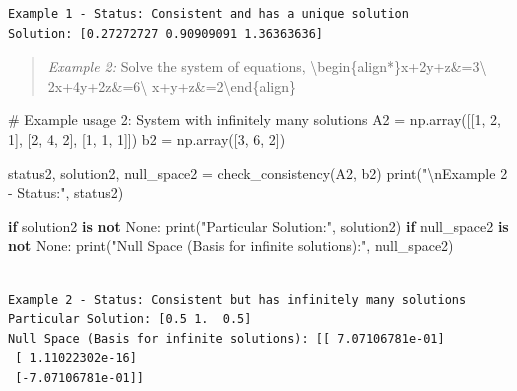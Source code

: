 \documentclass[
  letterpaper,
  DIV=11,
  numbers=noendperiod]{scrreprt}
\newenvironment{Shaded}{\begin{snugshade}}{\end{snugshade}}
\newcommand{\BuiltInTok}[1]{\textcolor[rgb]{0.00,0.23,0.31}{#1}}
\newcommand{\CharTok}[1]{\textcolor[rgb]{0.13,0.47,0.30}{#1}}
\newcommand{\CommentTok}[1]{\textcolor[rgb]{0.37,0.37,0.37}{#1}}
\newcommand{\ControlFlowTok}[1]{\textcolor[rgb]{0.00,0.23,0.31}{\textbf{#1}}}
\newcommand{\DecValTok}[1]{\textcolor[rgb]{0.68,0.00,0.00}{#1}}
\newcommand{\KeywordTok}[1]{\textcolor[rgb]{0.00,0.23,0.31}{\textbf{#1}}}
\newcommand{\NormalTok}[1]{\textcolor[rgb]{0.00,0.23,0.31}{#1}}
\newcommand{\OperatorTok}[1]{\textcolor[rgb]{0.37,0.37,0.37}{#1}}
\newcommand{\StringTok}[1]{\textcolor[rgb]{0.13,0.47,0.30}{#1}}
\newcommand{\VariableTok}[1]{\textcolor[rgb]{0.07,0.07,0.07}{#1}}
\theoremstyle{plain}
\theoremstyle{definition}
\theoremstyle{remark}
\begin{document}
\begin{verbatim}
Example 1 - Status: Consistent and has a unique solution
Solution: [0.27272727 0.90909091 1.36363636]
\end{verbatim}

\begin{quote}
\emph{Example 2:} Solve the system of equations,
\textbackslash begin\{align*\}x+2y+z\&=3\textbackslash{}
2x+4y+2z\&=6\textbackslash{} x+y+z\&=2\textbackslash end\{align\}
\end{quote}

\begin{Shaded}
\begin{Highlighting}[]
\CommentTok{\# Example usage 2: System with infinitely many solutions}
\NormalTok{A2 }\OperatorTok{=}\NormalTok{ np.array([[}\DecValTok{1}\NormalTok{, }\DecValTok{2}\NormalTok{, }\DecValTok{1}\NormalTok{], [}\DecValTok{2}\NormalTok{, }\DecValTok{4}\NormalTok{, }\DecValTok{2}\NormalTok{], [}\DecValTok{1}\NormalTok{, }\DecValTok{1}\NormalTok{, }\DecValTok{1}\NormalTok{]])}
\NormalTok{b2 }\OperatorTok{=}\NormalTok{ np.array([}\DecValTok{3}\NormalTok{, }\DecValTok{6}\NormalTok{, }\DecValTok{2}\NormalTok{])}

\NormalTok{status2, solution2, null\_space2 }\OperatorTok{=}\NormalTok{ check\_consistency(A2, b2)}
\BuiltInTok{print}\NormalTok{(}\StringTok{"}\CharTok{\textbackslash{}n}\StringTok{Example 2 {-} Status:"}\NormalTok{, status2)}

\ControlFlowTok{if}\NormalTok{ solution2 }\KeywordTok{is} \KeywordTok{not} \VariableTok{None}\NormalTok{:}
    \BuiltInTok{print}\NormalTok{(}\StringTok{"Particular Solution:"}\NormalTok{, solution2)}
\ControlFlowTok{if}\NormalTok{ null\_space2 }\KeywordTok{is} \KeywordTok{not} \VariableTok{None}\NormalTok{:}
    \BuiltInTok{print}\NormalTok{(}\StringTok{"Null Space (Basis for infinite solutions):"}\NormalTok{, null\_space2)}
\end{Highlighting}
\end{Shaded}

\begin{verbatim}

Example 2 - Status: Consistent but has infinitely many solutions
Particular Solution: [0.5 1.  0.5]
Null Space (Basis for infinite solutions): [[ 7.07106781e-01]
 [ 1.11022302e-16]
 [-7.07106781e-01]]
\end{verbatim}
\end{document}
